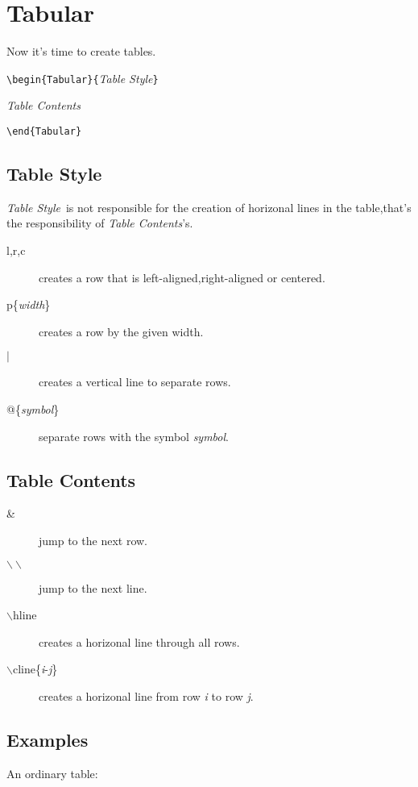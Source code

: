 \documentclass[a4paper]{report}
\begin{document}
\section{Tabular}

Now it's time to create tables.

\verb|\begin{Tabular}{|\emph{Table Style}\verb|}|

\emph{Table Contents}

\verb|\end{Tabular}|

\subsection{Table Style}
\emph{Table Style}\ is not responsible for the creation of horizonal
lines in the table,that's the responsibility of \emph{Table
Contents}'s.
\begin{description}
\item[l,r,c] creates a row that is left-aligned,right-aligned or
centered.

\item[p\{\emph{width}\}] creates a row by the given width.

\item[$|$] creates a vertical line to separate rows.

\item[@\{\emph{symbol}\}]separate rows with the symbol
\emph{symbol}.
\end{description}

\subsection{Table Contents}
\begin{description}
\item[\&] jump to the next row.

\item[$\backslash\backslash$] jump to the next line.

\item[$\backslash$hline] creates a horizonal line through all rows.

\item[$\backslash$cline\{\emph{i}-\emph{j}\}] creates a horizonal line from row \emph{i} to row \emph{j}.
\end{description}

\subsection{Examples}
An ordinary table:\\
\end{document}
